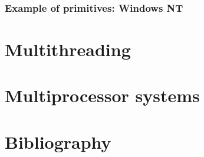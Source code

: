 
\begin{frame}
  \frametitle{Example of primitives: Windows NT}
\end{frame}

%
%

\section{Multithreading}

%
%

\section{Multiprocessor systems}

%
%

\section{Bibliography}

\begin{thebibliography}{4}


\end{thebibliography}

